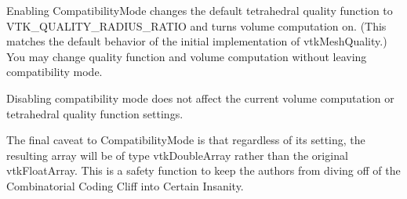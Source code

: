 \begin{itemize}
 Enabling CompatibilityMode changes the default tetrahedral
 quality function to VTK\_QUALITY\_RADIUS\_RATIO and turns volume
 computation on. (This matches the default behavior of the
 initial implementation of vtkMeshQuality.) You may change
 quality function and volume computation without leaving
 compatibility mode.

 Disabling compatibility mode does not affect the current
 volume computation or tetrahedral quality function settings. 

 The final caveat to CompatibilityMode is that regardless of
 its setting, the resulting array will be of type vtkDoubleArray
 rather than the original vtkFloatArray.
 This is a safety function to keep the authors from
 diving off of the Combinatorial Coding Cliff into
 Certain Insanity.

\end{itemize}
